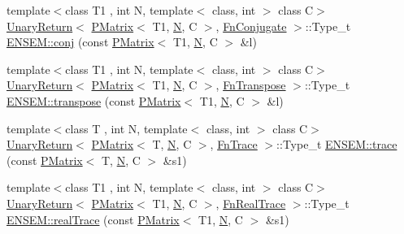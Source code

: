 \begin{DoxyCompactItemize}
\item 
{\footnotesize template$<$class T1 , int N, template$<$ class, int $>$ class C$>$ }\\\mbox{\hyperlink{structENSEM_1_1UnaryReturn}{Unary\+Return}}$<$ \mbox{\hyperlink{classENSEM_1_1PMatrix}{P\+Matrix}}$<$ T1, \mbox{\hyperlink{adat__devel_2lib_2hadron_2operator__name__util_8cc_a7722c8ecbb62d99aee7ce68b1752f337}{N}}, C $>$, \mbox{\hyperlink{structENSEM_1_1FnConjugate}{Fn\+Conjugate}} $>$\+::Type\+\_\+t \mbox{\hyperlink{group__primmatrix_gabbacb7d7e40fcf5d0bcd18aa907d33ea}{E\+N\+S\+E\+M\+::conj}} (const \mbox{\hyperlink{classENSEM_1_1PMatrix}{P\+Matrix}}$<$ T1, \mbox{\hyperlink{adat__devel_2lib_2hadron_2operator__name__util_8cc_a7722c8ecbb62d99aee7ce68b1752f337}{N}}, C $>$ \&l)
\item 
{\footnotesize template$<$class T1 , int N, template$<$ class, int $>$ class C$>$ }\\\mbox{\hyperlink{structENSEM_1_1UnaryReturn}{Unary\+Return}}$<$ \mbox{\hyperlink{classENSEM_1_1PMatrix}{P\+Matrix}}$<$ T1, \mbox{\hyperlink{adat__devel_2lib_2hadron_2operator__name__util_8cc_a7722c8ecbb62d99aee7ce68b1752f337}{N}}, C $>$, \mbox{\hyperlink{structENSEM_1_1FnTranspose}{Fn\+Transpose}} $>$\+::Type\+\_\+t \mbox{\hyperlink{group__primmatrix_gaffe281aeb23abb6d655321654f855e26}{E\+N\+S\+E\+M\+::transpose}} (const \mbox{\hyperlink{classENSEM_1_1PMatrix}{P\+Matrix}}$<$ T1, \mbox{\hyperlink{adat__devel_2lib_2hadron_2operator__name__util_8cc_a7722c8ecbb62d99aee7ce68b1752f337}{N}}, C $>$ \&l)
\item 
{\footnotesize template$<$class T , int N, template$<$ class, int $>$ class C$>$ }\\\mbox{\hyperlink{structENSEM_1_1UnaryReturn}{Unary\+Return}}$<$ \mbox{\hyperlink{classENSEM_1_1PMatrix}{P\+Matrix}}$<$ T, \mbox{\hyperlink{adat__devel_2lib_2hadron_2operator__name__util_8cc_a7722c8ecbb62d99aee7ce68b1752f337}{N}}, C $>$, \mbox{\hyperlink{structENSEM_1_1FnTrace}{Fn\+Trace}} $>$\+::Type\+\_\+t \mbox{\hyperlink{group__primmatrix_gafc761796f6ca23ee43cd937f3459e3ce}{E\+N\+S\+E\+M\+::trace}} (const \mbox{\hyperlink{classENSEM_1_1PMatrix}{P\+Matrix}}$<$ T, \mbox{\hyperlink{adat__devel_2lib_2hadron_2operator__name__util_8cc_a7722c8ecbb62d99aee7ce68b1752f337}{N}}, C $>$ \&s1)
\item 
{\footnotesize template$<$class T1 , int N, template$<$ class, int $>$ class C$>$ }\\\mbox{\hyperlink{structENSEM_1_1UnaryReturn}{Unary\+Return}}$<$ \mbox{\hyperlink{classENSEM_1_1PMatrix}{P\+Matrix}}$<$ T1, \mbox{\hyperlink{adat__devel_2lib_2hadron_2operator__name__util_8cc_a7722c8ecbb62d99aee7ce68b1752f337}{N}}, C $>$, \mbox{\hyperlink{structENSEM_1_1FnRealTrace}{Fn\+Real\+Trace}} $>$\+::Type\+\_\+t \mbox{\hyperlink{group__primmatrix_gaf2db8b017f816bb958ba639899fa1cf7}{E\+N\+S\+E\+M\+::real\+Trace}} (const \mbox{\hyperlink{classENSEM_1_1PMatrix}{P\+Matrix}}$<$ T1, \mbox{\hyperlink{adat__devel_2lib_2hadron_2operator__name__util_8cc_a7722c8ecbb62d99aee7ce68b1752f337}{N}}, C $>$ \&s1)

\end{DoxyCompactItemize}
